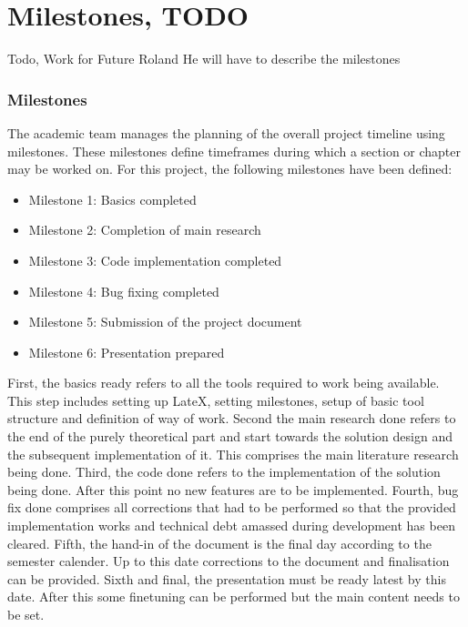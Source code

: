 \section{Milestones, TODO}
\label{ProjMgmtMilestones}





Todo,
Work for Future Roland
He will have to describe the milestones




\subsubsection*{Milestones}
The academic team manages the planning of the overall project timeline using milestones. These milestones define timeframes during which a section or chapter may be worked on. For this project, the following milestones have been defined:

\begin{itemize}
    \item Milestone 1: Basics completed
    \item Milestone 2: Completion of main research
    \item Milestone 3: Code implementation completed
    \item Milestone 4: Bug fixing completed
    \item Milestone 5: Submission of the project document
    \item Milestone 6: Presentation prepared
\end{itemize}

First, the basics ready refers to all the tools required to work being available. This step includes setting up LateX, setting milestones, setup of basic tool structure and definition of way of work. Second the main research done refers to the end of the purely theoretical part and start towards the solution design and the subsequent implementation of it. This comprises the main literature research being done. Third, the code done refers to the implementation of the solution being done. After this point no new features are to be implemented. Fourth, bug fix done comprises all corrections that had to be performed so that the provided implementation works and technical debt amassed during development has been cleared. Fifth, the hand-in of the document is the final day according to the semester calender. Up to this date corrections to the document and finalisation can be provided. Sixth and final, the presentation must be ready latest by this date. After this some finetuning can be performed but the main content needs to be set.

